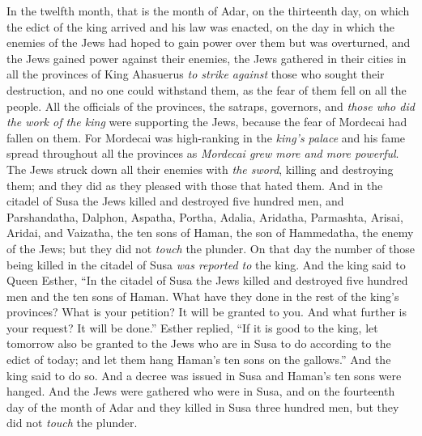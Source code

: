 \begin{biblechapter} %
 In the twelfth month, that is the month of Adar, on the thirteenth day, on which the edict of the king arrived and his law was enacted, on the day in which the enemies of the Jews had hoped to gain power over them but was overturned, and the Jews gained power against their enemies,
\verse the Jews gathered in their cities in all the provinces of King Ahasuerus \textit{to strike against} those who sought their destruction, and no one could withstand them, as the fear of them fell on all the people.
\verse All the officials of the provinces, the satraps, governors, and \textit{those who did the work of the king} were supporting the Jews, because the fear of Mordecai had fallen on them.
\verse For Mordecai was high-ranking in the \textit{king’s palace} and his fame spread throughout all the provinces as \textit{Mordecai grew more and more powerful}.
\verse The Jews struck down all their enemies with \textit{the sword}, killing and destroying them; and they did as they pleased with those that hated them.
\verse And in the citadel of Susa the Jews killed and destroyed five hundred men,
\verse and Parshandatha, Dalphon, Aspatha,
\verse Portha, Adalia, Aridatha,
\verse Parmashta, Arisai, Aridai, and Vaizatha,
\verse the ten sons of Haman, the son of Hammedatha, the enemy of the Jews; but they did not \textit{touch} the plunder.
\verse On that day the number of those being killed in the citadel of Susa \textit{was reported to} the king.
\verse And the king said to Queen Esther, “In the citadel of Susa the Jews killed and destroyed five hundred men and the ten sons of Haman. What have they done in the rest of the king’s provinces? What is your petition? It will be granted to you. And what further is your request? It will be done.”
\verse Esther replied, “If it is good to the king, let tomorrow also be granted to the Jews who are in Susa to do according to the edict of today; and let them hang Haman’s ten sons on the gallows.”
\verse And the king said to do so. And a decree was issued in Susa and Haman’s ten sons were hanged.
\verse And the Jews were gathered who were in Susa, and on the fourteenth day of the month of Adar and they killed in Susa three hundred men, but they did not \textit{touch} the plunder.

\end{biblechapter}
